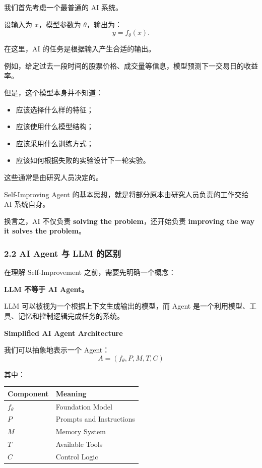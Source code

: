 我们首先考虑一个最普通的 AI 系统。

设输入为 \(x\)，模型参数为 \(\theta\)，输出为：
\[y=f_\theta(x).\]

在这里，AI 的任务是根据输入产生合适的输出。

例如，给定过去一段时间的股票价格、成交量等信息，模型预测下一交易日的收益率。

但是，这个模型本身并不知道：

\begin{itemize}
\tightlist
\item
  应该选择什么样的特征；
\item
  应该使用什么模型结构；
\item
  应该采用什么训练方式；
\item
  应该如何根据失败的实验设计下一轮实验。
\end{itemize}

这些通常是由研究人员决定的。

Self-Improving Agent 的基本思想，就是将部分原本由研究人员负责的工作交给 AI 系统自身。

换言之，AI 不仅负责 \textbf{solving the problem}，还开始负责 \textbf{improving the way it solves the problem}。

\hypertarget{part-1-03-0001-ai-agent-ux4e0e-llm-ux7684ux533aux522b}{%
\subsubsection{2.2 AI Agent 与 LLM 的区别}\label{part-1-03-0001-ai-agent-ux4e0e-llm-ux7684ux533aux522b}}

在理解 Self-Improvement 之前，需要先明确一个概念：

\textbf{LLM 不等于 AI Agent。}

LLM 可以被视为一个根据上下文生成输出的模型，而 Agent 是一个利用模型、工具、记忆和控制逻辑完成任务的系统。

\textbf{Simplified AI Agent Architecture}


我们可以抽象地表示一个 Agent：
\[A=(f_\theta,P,M,T,C)\]

其中：

\begin{readertable}
\begin{longtable}[]{@{}
  >{\raggedright\arraybackslash}p{}
  >{\raggedright\arraybackslash}p{}@{}}
\toprule
Component & Meaning \\
\midrule
\endhead
\(f_\theta\) & Foundation Model \\
\(P\) & Prompts and Instructions \\
\(M\) & Memory System \\
\(T\) & Available Tools \\
\(C\) & Control Logic \\
\bottomrule
\end{longtable}
\end{readertable}

